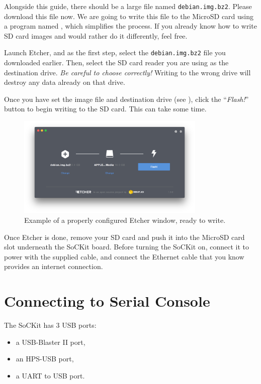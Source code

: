 \documentclass{sockitguide}
\begin{document}
Alongside this guide, there should be a large file named
\texttt{debian.img.bz2}. Please download this file now. We are going
to write this file to the MicroSD card using a program named
, which simplifies the process. If
you already know how to write SD card images and would rather do it
differently, feel free.

Launch Etcher, and as the first step, select the
\texttt{debian.img.bz2} file you downloaded earlier. Then, select the
SD card reader you are using as the destination drive. \textit{Be
  careful to choose correctly!} Writing to the wrong drive will
destroy any data already on that drive.

Once you have set the image file and destination drive (see
), click the ``\textit{Flash!}'' button to begin writing
to the SD card. This can take some time.

\begin{figure}
  \includegraphics[width=9cm]{figures/etcher.png}
  \caption{Example of a properly configured Etcher window, ready to write.}
  \label{fig:etcher}
\end{figure}

Once Etcher is done, remove your SD card and push it into the MicroSD
card slot underneath the SoCKit board. Before turning the SoCKit on,
connect it to power with the supplied cable, and connect the Ethernet
cable that you know provides an internet connection.

\section{Connecting to Serial Console}

The SoCKit has \num{3} USB ports:
\begin{itemize}
\item a USB-Blaster II port,
\item an HPS-USB port,
\item a UART to USB port.
\end{itemize}
\end{document}
